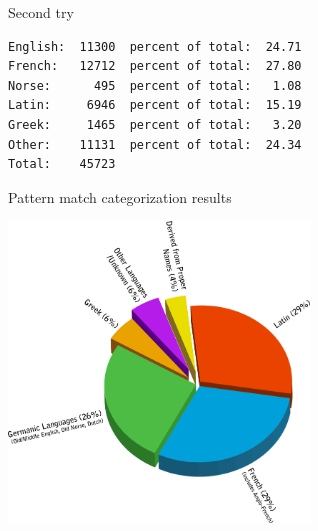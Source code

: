 \documentclass[10pt]{beamer}
\begin{document}










\begin{frame}[fragile]{Second try}
\pause
\begin{verbatim}
English:  11300  percent of total:  24.71
French:   12712  percent of total:  27.80
Norse:      495  percent of total:   1.08
Latin:     6946  percent of total:  15.19
Greek:     1465  percent of total:   3.20
Other:    11131  percent of total:  24.34
Total:    45723

\end{verbatim}

\end{frame}

\begin{frame}[fragile]{Pattern match categorization results}

  \centerline{\includegraphics[width=8cm]{badchart.png}}

\end{frame}
\end{document}
